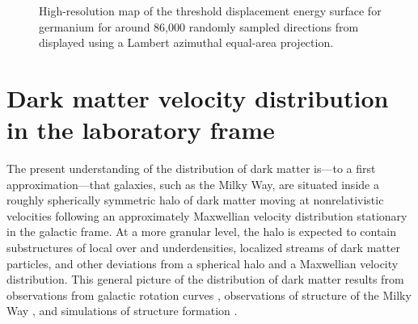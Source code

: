 \begin{figure}
    \caption{High-resolution map of the threshold displacement energy surface for germanium for around 86,000 randomly sampled directions from \textcite{KadribasicEtAl2018} displayed using a Lambert azimuthal equal-area projection.}
    \label{fig:ge-threshold-energy}
\end{figure}

\chapter{Dark matter velocity distribution in the laboratory frame}
\label{chap:dist}

The present understanding of the distribution of dark matter is---to a first approximation---that galaxies, such as the Milky Way, are situated inside a roughly spherically symmetric halo of dark matter moving at nonrelativistic velocities following an approximately Maxwellian velocity distribution stationary in the galactic frame. At a more granular level, the halo is expected to contain substructures of local over and underdensities, localized streams of dark matter particles, and other deviations from a spherical halo and a Maxwellian velocity distribution. This general picture of the distribution of dark matter results from observations from galactic rotation curves \parencites{SofueEtAl1999, LelliMcGaughSchombert2016}, observations of structure of the Milky Way \parencites{PortailEtAl2016, LabiniEtAl2023, BelokurovEtAl2018, KruijssenEtAl2018, HelmiEtAl2018}, and simulations of structure formation \parencites{VogelsbergerEtAl2014, WangEtAl2015, KlypinEtAl2016, SpringelEtAl2017, SpringelEtAl2008, DiemandEtAl2008, StadelEtAl2009, vandenBoschOgiya2018}.


